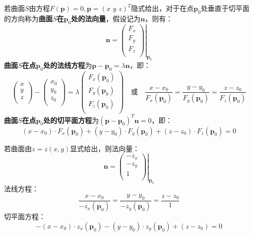 \begin{definition}
若曲面$S$由方程$F\left( \boldsymbol{p} \right) =0,\boldsymbol{p}=\left( x\,\,y\,\,z \right) ^T$隐式给出，对于在点$\boldsymbol{p}_0$处垂直于切平面的方向称为{\bf 曲面$S$在$\boldsymbol{p}_0$处的法向量}，假设记为$\boldsymbol{n}$，则有：
\[
\boldsymbol{n}=\left. \left( \begin{array}{c}
	F_x\\
	F_y\\
	F_z\\
\end{array} \right) \right|_{\boldsymbol{p}_0}
\]
{\bf 曲面$S$在点$\boldsymbol{p}_0$处的法线方程}为$\boldsymbol{p}-\boldsymbol{p}_0=\lambda \boldsymbol{n}$，即：
\[
\left( \begin{array}{c}
	x\\
	y\\
	z\\
\end{array} \right) -\left( \begin{array}{c}
	x_0\\
	y_0\\
	z_0\\
\end{array} \right) =\lambda \left( \begin{array}{c}
	F_x\left( \boldsymbol{p}_0 \right)\\
	F_y\left( \boldsymbol{p}_0 \right)\\
	F_z\left( \boldsymbol{p}_0 \right)\\
\end{array} \right) \quad \text{或} \quad \frac{x-x_0}{F_x\left( \boldsymbol{p}_0 \right)}=\frac{y-y_0}{F_y\left( \boldsymbol{p}_0 \right)}=\frac{z-z_0}{F_z\left( \boldsymbol{p}_0 \right)}
\]
{\bf 曲面$S$在点$\boldsymbol{p}_0$处的切平面方程}为$\left( \boldsymbol{p}-\boldsymbol{p}_0 \right) ^T\boldsymbol{n}=0$，即：
\[
\left( x-x_0 \right) \cdot F_x\left( \boldsymbol{p}_0 \right) +\left( y-y_0 \right) \cdot F_y\left( \boldsymbol{p}_0 \right) +\left( z-z_0 \right) \cdot F_z\left( \boldsymbol{p}_0 \right) =0
\]
\end{definition}

若曲面由$z=z\left( x,y \right) $显式给出，则法向量：
\[
\boldsymbol{n}=\left. \left( \begin{array}{c}
	-z_x\\
	-z_y\\
	1\\
\end{array} \right) \right|_{\boldsymbol{p}_0}
\]
法线方程：
\[
\frac{x-x_0}{-z_x\left( \boldsymbol{p}_0 \right)}=\frac{y-y_0}{-z_y\left( \boldsymbol{p}_0 \right)}=\frac{z-z_0}{1}
\]
切平面方程：
\[
-\left( x-x_0 \right) \cdot z_x\left( \boldsymbol{p}_0 \right) -\left( y-y_0 \right) \cdot z_y\left( \boldsymbol{p}_0 \right) +\left( z-z_0 \right) =0
\]

